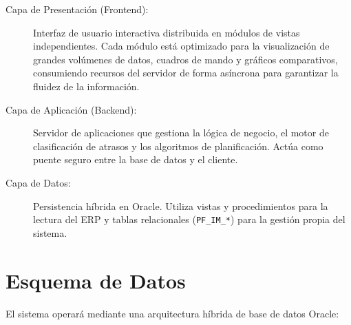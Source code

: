 \documentclass[11pt, letterpaper]{article}
\begin{document}
\begin{description}
    \item[Capa de Presentación (Frontend):] Interfaz de usuario interactiva distribuida en módulos de vistas independientes. Cada módulo está optimizado para la visualización de grandes volúmenes de datos, cuadros de mando y gráficos comparativos, consumiendo recursos del servidor de forma asíncrona para garantizar la fluidez de la información.
    \item[Capa de Aplicación (Backend):] Servidor de aplicaciones que gestiona la lógica de negocio, el motor de clasificación de atrasos y los algoritmos de planificación. Actúa como puente seguro entre la base de datos y el cliente.
    \item[Capa de Datos:] Persistencia híbrida en Oracle. Utiliza vistas y procedimientos para la lectura del ERP y tablas relacionales (\texttt{PF\_IM\_*}) para la gestión propia del sistema.
\end{description}



\section{Esquema de Datos}

El sistema operará mediante una arquitectura híbrida de base de datos Oracle:
\end{document}
